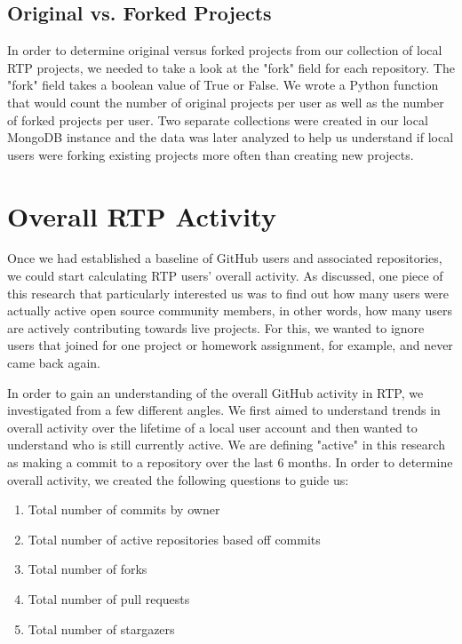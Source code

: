

\subsection{Original vs. Forked Projects}
\label{origvsforked}
In order to determine original versus forked projects from our collection of local RTP projects, we needed to take a look at the "fork" field for each repository. The "fork" field takes a boolean value of True or False. We wrote a Python function that would count the number of original projects per user as well as the number of forked projects per user. Two separate collections were created in our local MongoDB instance and the data was later analyzed to help us understand if local users were forking existing projects more often than creating new projects.

\section{Overall RTP Activity}
Once we had established a baseline of GitHub users and associated repositories, we could start calculating RTP users' overall activity. As discussed, one piece of this research that particularly interested us was to find out how many users were actually active open source community members, in other words, how many users are actively contributing towards live projects. For this, we wanted to ignore users that joined for one project or homework assignment, for example, and never came back again. 

In order to gain an understanding of the overall GitHub activity in RTP, we investigated from a few different angles. We first aimed to understand trends in overall activity over the lifetime of a local user account and then wanted to understand who is still currently active. We are defining "active" in this research as making a commit to a repository over the last 6 months. In order to determine overall activity, we created the following questions to guide us:

\begin{enumerate}
\item Total number of commits by owner
\item Total number of active repositories based off commits
\item Total number of forks
\item Total number of pull requests
\item Total number of stargazers
\end{enumerate}

